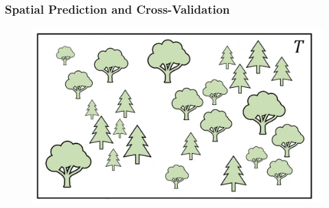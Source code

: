 \documentclass[
  shownotes,
  xcolor={svgnames},
  hyperref={colorlinks,citecolor=DarkBlue,linkcolor=andesred,urlcolor=DarkBlue}
  , aspectratio=169]{beamer}
\begin{document}
\begin{frame}[fragile]
\frametitle{Spatial Prediction and Cross-Validation}

  \begin{minipage}[c]{0.6\linewidth}
        
      \begin{figure}[H] \centering
        \captionsetup{justification=centering}
        \includegraphics[scale=0.3]{figures/spatial_cross/fig02.png}
      \end{figure}
           
    \end{minipage}
    \hfill
    \begin{minipage}[t]{0.35\linewidth}%
    

    \end{minipage}

\end{frame}
\end{document}
